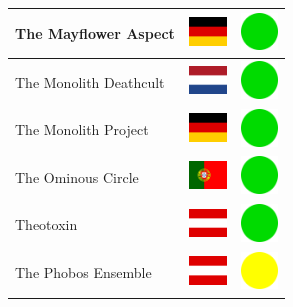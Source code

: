 \documentclass[12pt, a4paper, twoside]{report}
\begin{document}
\begin{center}
\begin{longtable}{|p{5cm}|p{2cm}|p{2cm}|}
 The Mayflower Aspect                                       & \includegraphics[width=1cm]{../img/flags/de} &   \includegraphics[width=1cm]{../likes/y} \\ \hline
 The Monolith Deathcult                                     & \includegraphics[width=1cm]{../img/flags/nl} &   \includegraphics[width=1cm]{../likes/y} \\ \hline
 The Monolith Project                                       & \includegraphics[width=1cm]{../img/flags/de} &   \includegraphics[width=1cm]{../likes/y} \\ \hline
 The Ominous Circle                                         & \includegraphics[width=1cm]{../img/flags/pt} &   \includegraphics[width=1cm]{../likes/y} \\ \hline
 Theotoxin                                                  & \includegraphics[width=1cm]{../img/flags/at} &   \includegraphics[width=1cm]{../likes/y} \\ \hline
 The Phobos Ensemble                                        & \includegraphics[width=1cm]{../img/flags/at} &   \includegraphics[width=1cm]{../likes/m} \\ \hline

\end{longtable}
\end{center}
\end{document}
